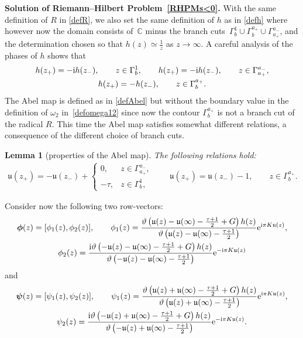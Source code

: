 \documentclass[pdftex]{sigma}
\numberwithin{equation}{section}
\newtheorem{Lemma}[Theorem]{Lemma}
\theoremstyle{definition}
\def\Abel{\mathfrak u}
\def\le{\left}
\def \bs{\boldsymbol}
\def\ri{\right}
\def\nn{\nonumber}
\def\C{{\mathbb C}}
\begin{document}
{\bf Solution of Riemann--Hilbert Problem~\ref{RHPMs<0}.}
With the same definition of $R$ in \eqref{defR}, we also set the same definition of $h$ as in \eqref{defh}
where however now the domain consists of~$\C$ minus the branch cuts~${\Gamma_b^1\cup \Gamma_{b}^{a_+}\cup \Gamma_{a_+}^{a_-}}$, and the determination chosen so that $h(z) \simeq \frac 1 z $ as $z\to \infty$.
A careful analysis of the phases of $h$ shows that
\begin{gather*}
h(z_+) = -{\rm i} h(z_-),\qquad z\in \Gamma_{b}^1,\qquad
h(z_+) =-{\rm i} h(z_-),\qquad z\in \Gamma_{a_+}^{a_-},\\
h(z_+) =-h(z_-),\qquad z\in \Gamma_{b}^{a_+}.
\end{gather*}
The Abel map is defined as in \eqref{defAbel} but without the boundary value in the definition of $\omega_2$ in~\eqref{defomega12} since now the contour $\Gamma_{b}^{a_+}$ is not a branch cut of the radical $R$.
This time the Abel map satisfies somewhat different relations, a consequence of the different choice of branch cuts.
\begin{Lemma}[properties of the Abel map]
\label{lemmaAbels<0}
The following relations hold:
\begin{gather*}
\Abel(z_+)=-\Abel(z_-) +
\begin{cases}
0,& z\in \Gamma_{a_+}^{a_-},\\
-\tau, & z\in \Gamma_b^1,
\end{cases}
\qquad
\Abel(z_+) = \Abel(z_-)-1, \qquad z\in \Gamma_b^{a_+}.
\end{gather*}
\end{Lemma}
Consider now the following two row-vectors:
\begin{gather*}%
\bs \phi (z)= [\phi_1(z), \phi_2(z)],\qquad
\phi_1(z) = \frac { \vartheta\le(\Abel(z)-\Abel(\infty) - \frac {\tau+1}2 +
G\ri)h(z)}{\vartheta\le(\Abel(z)-\Abel(\infty) - \frac{\tau+1}2\ri)}{\rm e}^{{\rm i}\pi K \Abel(z)},
\nn\\
\phi_2(z) = \frac {{\rm i} \vartheta\le(-\Abel(z)-\Abel(\infty) - \frac {\tau+1}2 +
G\ri)h(z)}{\vartheta\le(-\Abel(z)-\Abel(\infty) - \frac{\tau+1}2\ri)}{\rm e}^{-{\rm i}\pi K \Abel(z)}
\end{gather*}
and
\begin{gather*}%
\bs\psi(z) = [\psi_1(z), \psi_2(z)],\qquad
\psi_1(z) = \frac { \vartheta\le(\Abel(z)+\Abel(\infty) - \frac {\tau+1}2 +
G\ri)h(z)}{\vartheta\le(\Abel(z)+\Abel(\infty) - \frac{\tau+1}2\ri)}{\rm e}^{{\rm i}\pi K \Abel(z)},
\\
\psi_2(z) = \frac {{\rm i} \vartheta\le(-\Abel(z)+\Abel(\infty) - \frac {\tau+1}2 +
G\ri)h(z)}{\vartheta\le(-\Abel(z)+\Abel(\infty) - \frac{\tau+1}2\ri)}{\rm e}^{-{\rm i}\pi K \Abel(z)}.
\end{gather*}
\end{document}
